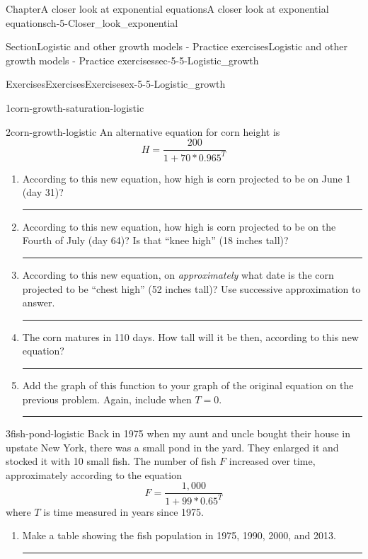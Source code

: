 \documentclass[twoside,11pt,]{book}
\newlength{\workspacestrutwidth}
\numberwithin{equation}{section}
\begin{document}
\begin{chapterptx}{Chapter}{A closer look at exponential equations}{}{A closer look at exponential equations}{}{}{ch-5-Closer_look_exponential}
\begin{sectionptx}{Section}{Logistic and other growth models - Practice exercises}{}{Logistic and other growth models - Practice exercises}{}{}{sec-5-5-Logistic_growth}
\begin{exercises-subsection-numberless}{Exercises}{Exercises}{}{Exercises}{}{}{ex-5-5-Logistic_growth}
\begin{divisionexercise}{1}{}{}{corn-growth-saturation-logistic}
\end{divisionexercise}%
\clearpage
\begin{divisionexercise}{2}{}{}{corn-growth-logistic}%
An alternative equation for corn height is%
\begin{equation*}
H = \frac{200}{1+70\ast0.965^T}
\end{equation*}
%
\begin{enumerate}[label=(\alph*),ref=\alph*]%
\item{}According to this new equation, how high is corn projected to be on June 1 (day 31)?%
\par\rule{\workspacestrutwidth}{1in}%
\item{}According to this new equation, how high is corn projected to be on the Fourth of July (day 64)? Is that ``knee high'' (18 inches tall)?%
\par\rule{\workspacestrutwidth}{1in}%
\item{}According to this new equation, on \emph{approximately} what date is the corn projected to be ``chest high'' (52 inches tall)? Use successive approximation to answer.%
\par\rule{\workspacestrutwidth}{1.5in}%
\item{}The corn matures in 110 days. How tall will it be then, according to this new equation?%
\par\rule{\workspacestrutwidth}{1in}%
\item{}Add the graph of this function to your graph of the original equation on the previous problem. Again, include when \(T=0\).%
\par\rule{\workspacestrutwidth}{0in}%
\end{enumerate}%
\end{divisionexercise}%
\clearpage
\begin{divisionexercise}{3}{}{}{fish-pond-logistic}%
Back in 1975 when my aunt and uncle bought their house in upstate New York, there was a small pond in the yard. They enlarged it and stocked it with 10 small fish. The number of fish \(F\) increased over time, approximately according to the equation%
\begin{equation*}
F=\frac{1{,}000}{1+99 \ast 0.65^T}
\end{equation*}
where \(T\) is time measured in years since 1975.%
\begin{enumerate}[label=(\alph*),ref=\alph*]%
\item{}Make a table showing the fish population in 1975, 1990, 2000, and 2013.%
\par\rule{\workspacestrutwidth}{1.75in}%

\end{enumerate}
\end{divisionexercise}
\end{exercises-subsection-numberless}
\end{sectionptx}
\end{chapterptx}
\end{document}
